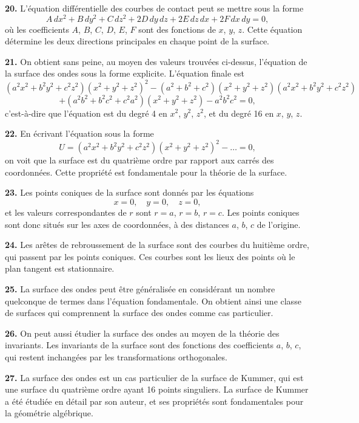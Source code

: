 \documentclass[11pt,a4paper]{book}
\begin{document}
{{{\textbf{20.} L'\'equation diff\'erentielle des courbes de contact peut se mettre sous
la forme
\[
A\,dx^2 + B\,dy^2 + C\,dz^2 + 2D\,dy\,dz + 2E\,dz\,dx + 2F\,dx\,dy = 0,
\]
o\`u les coefficients $A$, $B$, $C$, $D$, $E$, $F$ sont des fonctions de $x$, $y$, $z$. Cette \'equation
d\'etermine les deux directions principales en chaque point de la surface.

\newpage
\textbf{21.} On obtient sans peine, au moyen des valeurs trouv\'ees ci-dessus,
l'\'equation de la surface des ondes sous la forme explicite. L'\'equation finale est
\[
(a^2x^2 + b^2y^2 + c^2z^2)(x^2 + y^2 + z^2)^2 - (a^2 + b^2 + c^2)(x^2 + y^2 + z^2)(a^2x^2 + b^2y^2 + c^2z^2)
\]
\[
+ (a^2b^2 + b^2c^2 + c^2a^2)(x^2 + y^2 + z^2) - a^2b^2c^2 = 0,
\]
c'est-\`a-dire que l'\'equation est du degr\'e 4 en $x^2$, $y^2$, $z^2$, et du degr\'e 16 en $x$, $y$, $z$.

\textbf{22.} En \'ecrivant l'\'equation sous la forme
\[
U = (a^2x^2 + b^2y^2 + c^2z^2)(x^2 + y^2 + z^2)^2 - \ldots = 0,
\]
on voit que la surface est du quatri\`eme ordre par rapport aux carr\'es des
coordonn\'ees. Cette propri\'et\'e est fondamentale pour la th\'eorie de la surface.

\textbf{23.} Les points coniques de la surface sont donn\'es par les \'equations
\[
x = 0, \quad y = 0, \quad z = 0,
\]
et les valeurs correspondantes de $r$ sont $r = a$, $r = b$, $r = c$. Les points coniques
sont donc situ\'es sur les axes de coordonn\'ees, \`a des distances $a$, $b$, $c$ de l'origine.

\textbf{24.} Les ar\^etes de rebroussement de la surface sont des courbes du huiti\`eme
ordre, qui passent par les points coniques. Ces courbes sont les lieux des points
o\`u le plan tangent est stationnaire.

\textbf{25.} La surface des ondes peut \^etre g\'en\'eralis\'ee en consid\'erant un nombre
quelconque de termes dans l'\'equation fondamentale. On obtient ainsi une classe
de surfaces qui comprennent la surface des ondes comme cas particulier.

\textbf{26.} On peut aussi \'etudier la surface des ondes au moyen de la th\'eorie
des invariants. Les invariants de la surface sont des fonctions des coefficients
$a$, $b$, $c$, qui restent inchang\'ees par les transformations orthogonales.

\textbf{27.} La surface des ondes est un cas particulier de la surface de Kummer,
qui est une surface du quatri\`eme ordre ayant 16 points singuliers. La surface de
Kummer a \'et\'e \'etudi\'ee en d\'etail par son auteur, et ses propri\'et\'es sont fondamentales
pour la g\'eom\'etrie alg\'ebrique.

}}}
\end{document}
